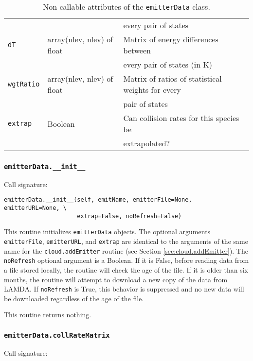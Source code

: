 \documentclass[12pt]{article}
\begin{document}
\begin{table}
\begin{center}
\begin{tabular}{lll}
& & \quad every pair of states\\
\texttt{dT} & array(nlev, nlev) of float & Matrix of energy differences between\\
& & \quad every pair of states (in K) \\
\texttt{wgtRatio} & array(nlev, nlev) of float & Matrix of ratios of statistical weights for every \\
& & \quad pair of states \\
\texttt{extrap} & Boolean & Can collision rates for this species be\\
& & \quad extrapolated? \\
\hline
\end{tabular}
\caption{
\label{tab:emitterData}
Non-callable attributes of the \texttt{emitterData} class.
}
\end{center}
\end{table}

\subsubsection{\texttt{emitterData.\_\_init\_\_}}

Call signature:

\begin{verbatim}
emitterData.__init__(self, emitName, emitterFile=None, emitterURL=None, \
                     extrap=False, noRefresh=False)
\end{verbatim}

This routine initializes \verb=emitterData= objects. The optional arguments \verb=emitterFile=, \verb=emitterURL=, and \verb=extrap= are identical to the arguments of the same name for the \verb=cloud.addEmitter= routine (see Section \ref{sec:cloud.addEmitter}). The \verb=noRefresh= optional argument is a Boolean. If it is False, before reading data from a file stored locally, the routine will check the age of the file. If it is older than six months, the routine will attempt to download a new copy of the data from LAMDA. If \verb=noRefresh= is True, this behavior is suppressed and no new data will be downloaded regardless of the age of the file.

This routine returns nothing.

\subsubsection{\texttt{emitterData.collRateMatrix}}

Call signature:
\end{document}

